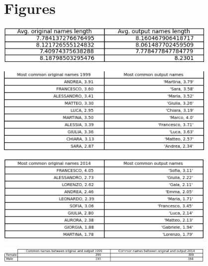 \documentclass{article}
\renewcommand{\familydefault}{\rmdefault}
\begin{document}
\renewcommand{\familydefault}{\rmdefault}


\fontsize{11}{15}\selectfont{
    
}

\section*{Figures}

\vspace{20pt}

\begin{center}
    \includegraphics[width=0.8\textwidth]{Avg. length table.png}
    \label{fig 1: Average length of names}
\end{center} 

\begin{center}
    \includegraphics[width=0.8\textwidth]{most_used_1999.png}
    \label{fig 2: Common names 1999}
\end{center} 

\begin{center}
    \includegraphics[width=0.8\textwidth]{most_used_names_2014.png}
    \label{fig 3: Common names 2014}
\end{center} 

\begin{center}
    \includegraphics[width=0.8\textwidth]{number_common_names_table.png}
    \label{fig 4: Number of common names}
\end{center}
\end{document}
